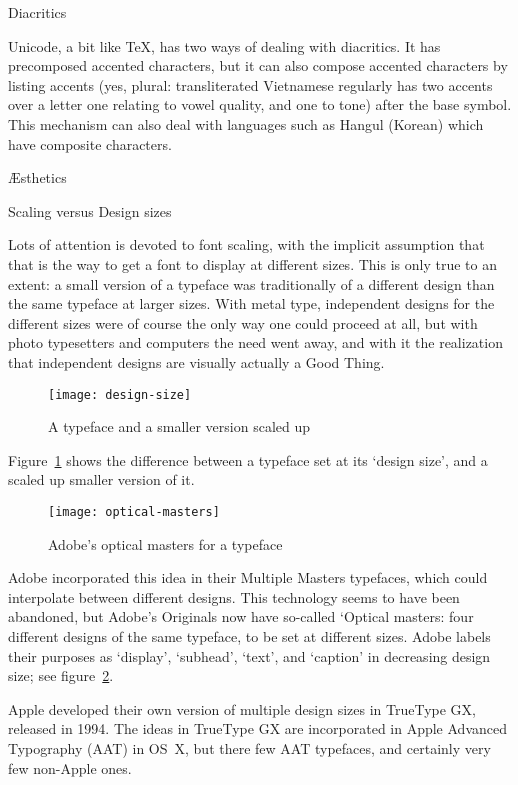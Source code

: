  {Diacritics}

Unicode, a bit like \TeX, has two ways of dealing with diacritics. It
has precomposed accented characters, but it can also compose accented
characters by listing accents (yes, plural: transliterated Vietnamese
regularly has two accents over a letter one relating to vowel quality,
and one to tone) after the base symbol. This
mechanism can also deal with languages such as Hangul (Korean) which
have composite characters.

 {\AE sthetics}

 {Scaling versus Design sizes}
\label{sec:design-size}

Lots of attention is devoted to font scaling, with the implicit assumption that
that is the way to get a font to display at different sizes. This is
only true to an extent: a small version of a typeface was
traditionally of a different design than the same typeface at larger
sizes. With metal type, independent designs for the different sizes
were of course the only way one could proceed at all, but with photo
typesetters and computers the need went away, and with it the
realization that independent designs are visually actually a Good
Thing.
\begin{figure}[ht]
\texttt{[image: design-size]}
\caption{A typeface and a smaller version scaled up}
\label{fig:design-size}
\end{figure}
Figure~\ref{fig:design-size} shows the difference between a typeface
set at its `design size', and a scaled up smaller
version of it.

\begin{figure}[ht]
\texttt{[image: optical-masters]}
\caption{Adobe's optical masters for a typeface}
\label{fig:optical-master}
\end{figure}
Adobe incorporated this idea in their Multiple Masters typefaces, which could interpolate
between different designs. This technology seems to have been
abandoned, but Adobe's Originals now have so-called `Optical masters: four different designs of the same
typeface, to be set at different sizes. Adobe labels their purposes as
`display', `subhead', `text', and `caption' in decreasing design size;
see figure~\ref{fig:optical-master}.

Apple developed their own version of multiple design sizes in TrueType
GX, released in 1994. The ideas in TrueType GX are incorporated in
Apple Advanced Typography (AAT) in OS~X, but there few AAT typefaces,
and certainly very few non-Apple ones.

